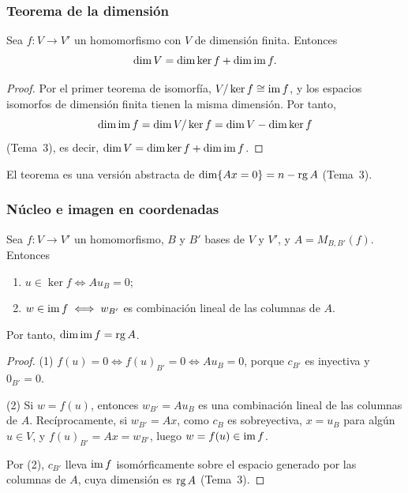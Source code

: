 \begin{frame}
    \frametitle{Teorema de la dimensión}

    \begin{corollary}
        Sea $f\colon V\to V'$ un homomorfismo con $V$ de dimensión
        finita. Entonces
        \[
            \dim V=\dim\ker f+\dim\operatorname{im} f.
        \]
    \end{corollary}

    \begin{proof}
        Por el primer teorema de isomorfía, $V/\ker f\cong\operatorname{im} f$, y los
        espacios isomorfos de dimensión finita tienen la misma dimensión.
        Por tanto,
        \[
            \dim\operatorname{im} f=\dim V/\ker f=\dim V-\dim\ker f
        \]
        (Tema~3), es decir, $\dim V=\dim\ker f+\dim\operatorname{im} f$.
    \end{proof}

    \medskip

    El teorema es una versión abstracta de
    $\dim\{Ax=0\}=n-\operatorname{rg} A$ (Tema~3).
\end{frame}


\begin{frame}
    \frametitle{Núcleo e imagen en coordenadas}

    \begin{proposition}
        Sea $f\colon V\to V'$ un homomorfismo, $B$ y $B'$ bases de $V$ y
        $V'$, y $A=M_{B,B'}(f)$. Entonces
        \begin{enumerate}[(1)]
            \item $u\in\ker f\iff Au_B=0$;
            \item $w\in\operatorname{im} f\iff w_{B'}$ es combinación lineal de las
            columnas de $A$.
        \end{enumerate}
        Por tanto, $\dim\operatorname{im} f=\operatorname{rg} A$.
    \end{proposition}

    \begin{proof}
        \alert{(1)} $f(u)=0\iff f(u)_{B'}=0\iff Au_B=0$, porque $c_{B'}$ es
        inyectiva y $0_{B'}=0$.

        \alert{(2)} Si $w=f(u)$, entonces $w_{B'}=Au_B$ es una combinación
        lineal de las columnas de $A$. Recíprocamente, si $w_{B'}=Ax$,
        como $c_B$ es sobreyectiva, $x=u_B$ para algún $u\in V$, y
        $f(u)_{B'}=Ax=w_{B'}$, luego $w=f(u)\in\operatorname{im} f$.

        Por (2), $c_{B'}$ lleva $\operatorname{im} f$ isomórficamente sobre el espacio
        generado por las columnas de $A$, cuya dimensión es $\operatorname{rg} A$
        (Tema~3).
    \end{proof}
\end{frame}


